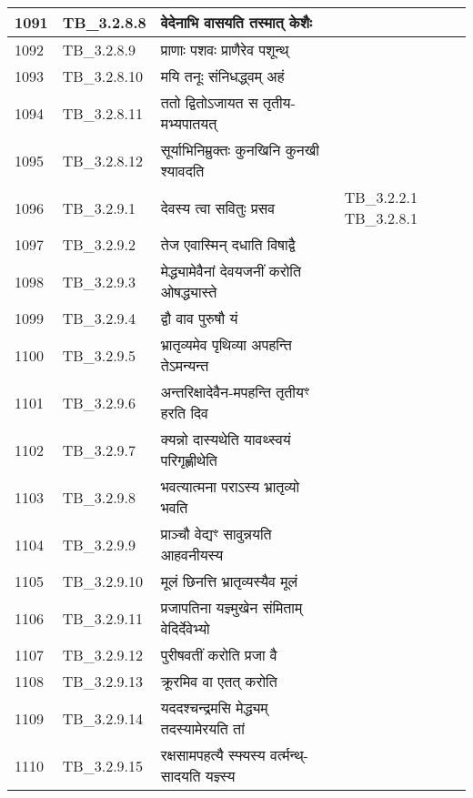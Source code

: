 \documentclass[17pt]{extarticle}
\begin{document}
\begin{longtable}{||p{0.4in}||p{0.9in}||p{4.0in}||p{0.9in}||}
        \hline
            1091 & TB\_3.2.8.8 & वेदेनाभि वासयति तस्मात् केशैः &      \\
        \hline
            1092 & TB\_3.2.8.9 & प्राणाः पशवः प्राणैरेव पशून्थ् &      \\
        \hline
            1093 & TB\_3.2.8.10 & मयि तनूः संनिधद्ध्वम् अहं &      \\
        \hline
            1094 & TB\_3.2.8.11 & ततो द्वितोऽजायत स तृतीय{-}मभ्यपातयत् &      \\
        \hline
            1095 & TB\_3.2.8.12 & सूर्याभिनिम्रुक्तः कुनखिनि कुनखी श्यावदति &      \\
        \hline
            1096 & TB\_3.2.9.1 & देवस्य त्वा सवितुः प्रसव & TB\_3.2.2.1 TB\_3.2.8.1        \\
        \hline
            1097 & TB\_3.2.9.2 & तेज एवास्मिन् दधाति विषाद्वै &      \\
        \hline
            1098 & TB\_3.2.9.3 & मेद्ध्यामेवैनां देवयजनीं करोति ओषद्ध्यास्ते &      \\
        \hline
            1099 & TB\_3.2.9.4 & द्वौ वाव पुरुषौ यं &      \\
        \hline
            1100 & TB\_3.2.9.5 & भ्रातृव्यमेव पृथिव्या अपहन्ति तेऽमन्यन्त &      \\
        \hline
            1101 & TB\_3.2.9.6 & अन्तरिक्षादेवैन{-}मपहन्ति तृतीयꣳ हरति दिव &      \\
        \hline
            1102 & TB\_3.2.9.7 & क्यन्नो दास्यथेति यावथ्स्वयं परिगृह्णीथेति &      \\
        \hline
            1103 & TB\_3.2.9.8 & भवत्यात्मना पराऽस्य भ्रातृव्यो भवति &      \\
        \hline
            1104 & TB\_3.2.9.9 & प्राञ्चौ वेद्यꣳ सावुन्नयति आहवनीयस्य &      \\
        \hline
            1105 & TB\_3.2.9.10 & मूलं छिनत्ति भ्रातृव्यस्यैव मूलं &      \\
        \hline
            1106 & TB\_3.2.9.11 & प्रजापतिना यज्ञ्मुखेन संमिताम् वेदिर्देवेभ्यो &      \\
        \hline
            1107 & TB\_3.2.9.12 & पुरीषवतीं करोति प्रजा वै &      \\
        \hline
            1108 & TB\_3.2.9.13 & क्रूरमिव वा एतत् करोति &      \\
        \hline
            1109 & TB\_3.2.9.14 & यददश्चन्द्रमसि मेद्ध्यम् तदस्यामेरयति तां &      \\
        \hline
            1110 & TB\_3.2.9.15 & रक्षसामपहत्यै स्फ्यस्य वर्त्मन्थ्{-}सादयति यज्ञ्स्य &      \\

\end{longtable}
\end{document}
